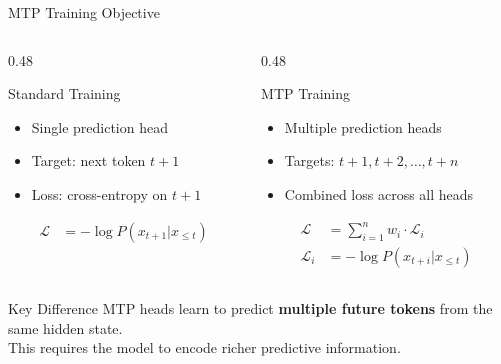 \documentclass[aspectratio=169, 11pt]{beamer}
\begin{document}
\begin{frame}{MTP Training Objective}

	\begin{columns}[T]
		\begin{column}{0.48\textwidth}
			\begin{block}{Standard Training}
				\begin{itemize}
					\item Single prediction head
					\item Target: next token $t+1$
					\item Loss: cross-entropy on $t+1$
				\end{itemize}
				\begin{align*}
					\mathcal{L} &= -\log P(x_{t+1} | x_{\leq t})
				\end{align*}
			\end{block}
		\end{column}
		\begin{column}{0.48\textwidth}
			\begin{block}{MTP Training}
				\begin{itemize}
					\item Multiple prediction heads
					\item Targets: $t+1, t+2, \ldots, t+n$
					\item Combined loss across all heads
				\end{itemize}
				\begin{align*}
					\mathcal{L} &= \sum_{i=1}^{n} w_i \cdot \mathcal{L}_i \\
					\mathcal{L}_i &= -\log P(x_{t+i} | x_{\leq t})
				\end{align*}
			\end{block}
		\end{column}
	\end{columns}

	\begin{block}{Key Difference}
		MTP heads learn to predict \textbf{multiple future tokens} from the same hidden state.\\
		This requires the model to encode richer predictive information.
	\end{block}

\end{frame}
\end{document}
